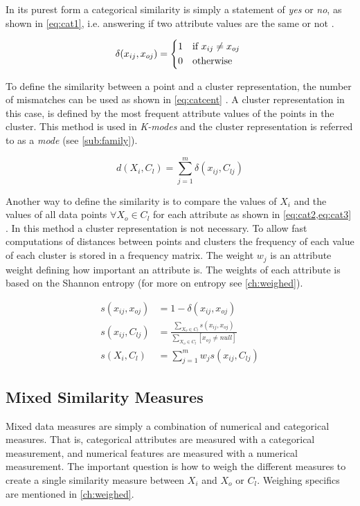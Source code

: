 \documentclass[../report.tex]{subfiles}
\begin{document}
In its purest form a categorical similarity is simply a statement of \textit{yes} or \textit{no}, as shown in \cref{eq:cat1}, i.e. answering if two attribute values are the same or not \cite{Guha2000, Kaufman1990}.


\begin{equation}
\label{eq:cat1}
\delta{(x_{ij},x_{oj})} =
  \begin{cases*}
  1 & if $x_{ij} \neq x_{oj}$ \\
    0 & otherwise
  \end{cases*}
\end{equation}

To define the similarity between a point and a cluster representation, the number of mismatches can be used as shown in \cref{eq:catcent} \cite{Ng1999,Huang97clusteringlarge}. A cluster representation in this case, is defined by the most frequent attribute values of the points in the cluster. This method is used in \textit{K-modes} and the cluster representation is referred to as a \textit{mode} \cite{Ng1999} (see \cref{sub:family}).

\begin{equation}
\label{eq:catcent}
d(X_{i},C_l) = \sum^{m}_{j=1}\delta(x_{ij},C_{lj})
\end{equation}

Another way to define the similarity is to compare the values of $X_i$ and the values of all data points $\forall X_o \in C_l$ for each attribute as shown in \cref{eq:cat2,eq:cat3} \cite{Guha2000, Cheung2013}. In this method a cluster representation is not necessary. To allow fast computations of distances between points and clusters the frequency of each value of each cluster is stored in a frequency matrix. The weight $w_j$ is an attribute weight defining how important an attribute is. The weights of each attribute is based on the Shannon entropy (for more on entropy see \cref{ch:weighed}).

\begin{align}
s(x_{ij},x_{oj}) &= 1 - \delta{(x_{ij},x_{oj})} \\
\label{eq:cat2}
s(x_{ij},C_{lj}) &= \frac{\sum_{X_o \in C_{l}}{s(x_{ij},x_{oj})}}{\sum_{X_o \in C_{l} }{[ x_{oj} \neq null ]}} \\
\label{eq:cat3}
s(X_{i},C_{l}) &= \sum_{j = 1}^{m}{w_j s(x_{ij},C_{lj})}
\end{align}

\subsection{Mixed Similarity Measures} \label{sssec:mixed-sim}
Mixed data measures are simply a combination of numerical and categorical measures. That is, categorical attributes are measured with a categorical measurement, and numerical features are measured with a numerical measurement. The important question is how to weigh the different measures to create a single similarity measure between $X_i$ and $X_o$ or $C_l$. Weighing specifics are mentioned in \cref{ch:weighed}.
\end{document}
